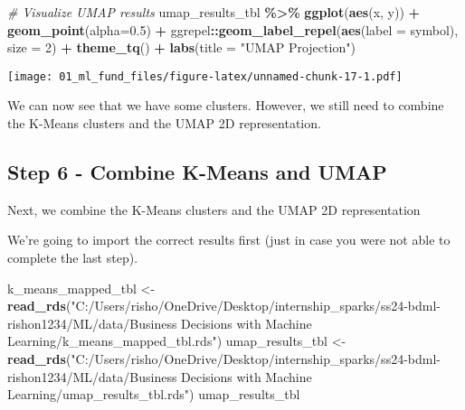 \documentclass[
]{article}
\newenvironment{Shaded}{\begin{snugshade}}{\end{snugshade}}
\newcommand{\AttributeTok}[1]{\textcolor[rgb]{0.13,0.29,0.53}{#1}}
\newcommand{\CommentTok}[1]{\textcolor[rgb]{0.56,0.35,0.01}{\textit{#1}}}
\newcommand{\DecValTok}[1]{\textcolor[rgb]{0.00,0.00,0.81}{#1}}
\newcommand{\FloatTok}[1]{\textcolor[rgb]{0.00,0.00,0.81}{#1}}
\newcommand{\FunctionTok}[1]{\textcolor[rgb]{0.13,0.29,0.53}{\textbf{#1}}}
\newcommand{\NormalTok}[1]{#1}
\newcommand{\OtherTok}[1]{\textcolor[rgb]{0.56,0.35,0.01}{#1}}
\newcommand{\SpecialCharTok}[1]{\textcolor[rgb]{0.81,0.36,0.00}{\textbf{#1}}}
\newcommand{\StringTok}[1]{\textcolor[rgb]{0.31,0.60,0.02}{#1}}
\begin{document}
\begin{Shaded}
\begin{Highlighting}[]
\CommentTok{\# Visualize UMAP results}
\NormalTok{umap\_results\_tbl }\SpecialCharTok{\%\textgreater{}\%}
    \FunctionTok{ggplot}\NormalTok{(}\FunctionTok{aes}\NormalTok{(x, y)) }\SpecialCharTok{+}
    \FunctionTok{geom\_point}\NormalTok{(}\AttributeTok{alpha=}\FloatTok{0.5}\NormalTok{) }\SpecialCharTok{+} 
\NormalTok{    ggrepel}\SpecialCharTok{::}\FunctionTok{geom\_label\_repel}\NormalTok{(}\FunctionTok{aes}\NormalTok{(}\AttributeTok{label =}\NormalTok{ symbol), }\AttributeTok{size =} \DecValTok{2}\NormalTok{) }\SpecialCharTok{+}
    \FunctionTok{theme\_tq}\NormalTok{() }\SpecialCharTok{+}
    \FunctionTok{labs}\NormalTok{(}\AttributeTok{title =} \StringTok{"UMAP Projection"}\NormalTok{) }
\end{Highlighting}
\end{Shaded}

\texttt{[image: 01\_ml\_fund\_files/figure-latex/unnamed-chunk-17-1.pdf]}

We can now see that we have some clusters. However, we still need to
combine the K-Means clusters and the UMAP 2D representation.

\hypertarget{step-6---combine-k-means-and-umap}{%
\subsection{Step 6 - Combine K-Means and
UMAP}\label{step-6---combine-k-means-and-umap}}

Next, we combine the K-Means clusters and the UMAP 2D representation

We're going to import the correct results first (just in case you were
not able to complete the last step).

\begin{Shaded}
\begin{Highlighting}[]
\NormalTok{k\_means\_mapped\_tbl }\OtherTok{\textless{}{-}} \FunctionTok{read\_rds}\NormalTok{(}\StringTok{"C:/Users/risho/OneDrive/Desktop/internship\_sparks/ss24{-}bdml{-}rishon1234/ML/data/Business Decisions with Machine Learning/k\_means\_mapped\_tbl.rds"}\NormalTok{)}
\NormalTok{umap\_results\_tbl   }\OtherTok{\textless{}{-}} \FunctionTok{read\_rds}\NormalTok{(}\StringTok{"C:/Users/risho/OneDrive/Desktop/internship\_sparks/ss24{-}bdml{-}rishon1234/ML/data/Business Decisions with Machine Learning/umap\_results\_tbl.rds"}\NormalTok{)}
\NormalTok{umap\_results\_tbl }
\end{Highlighting}
\end{Shaded}
\end{document}
